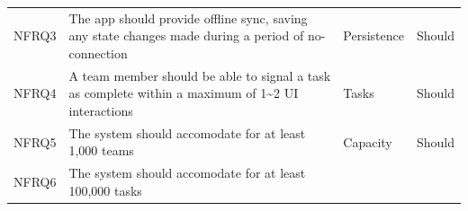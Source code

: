\documentclass[12pt]{report}
\begin{document}
\begin{longtable}[]{@{}llll@{}}
\begin{minipage}[t]{0.05\columnwidth}
NFRQ3\strut
\end{minipage} & \begin{minipage}[t]{0.63\columnwidth}\raggedright\strut
The app should provide offline sync, saving any state changes made
during a period of no-connection\strut
\end{minipage} & \begin{minipage}[t]{0.10\columnwidth}\raggedright\strut
Persistence\strut
\end{minipage} & \begin{minipage}[t]{0.11\columnwidth}\raggedright\strut
Should\strut
\end{minipage}\tabularnewline
\begin{minipage}[t]{0.05\columnwidth}\raggedright\strut
NFRQ4\strut
\end{minipage} & \begin{minipage}[t]{0.63\columnwidth}\raggedright\strut
A team member should be able to signal a task as complete within a
maximum of 1\textasciitilde{}2 UI interactions\strut
\end{minipage} & \begin{minipage}[t]{0.10\columnwidth}\raggedright\strut
Tasks\strut
\end{minipage} & \begin{minipage}[t]{0.11\columnwidth}\raggedright\strut
Should\strut
\end{minipage}\tabularnewline
\begin{minipage}[t]{0.05\columnwidth}\raggedright\strut
NFRQ5\strut
\end{minipage} & \begin{minipage}[t]{0.63\columnwidth}\raggedright\strut
The system should accomodate for at least 1,000 teams\strut
\end{minipage} & \begin{minipage}[t]{0.10\columnwidth}\raggedright\strut
Capacity\strut
\end{minipage} & \begin{minipage}[t]{0.11\columnwidth}\raggedright\strut
Should\strut
\end{minipage}\tabularnewline
\begin{minipage}[t]{0.05\columnwidth}\raggedright\strut
NFRQ6\strut
\end{minipage} & \begin{minipage}[t]{0.63\columnwidth}\raggedright\strut
The system should accomodate for at least 100,000 tasks\strut
\end{minipage} & \begin{minipage}[t]{0.10\columnwidth}\raggedright\strut

\end{minipage}
\end{longtable}
\end{document}

